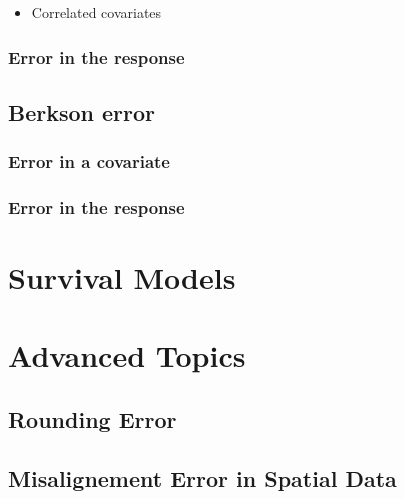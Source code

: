 \documentclass[]{book}
\providecommand{\tightlist}{%
  \setlength{\itemsep}{0pt}\setlength{\parskip}{0pt}}
\theoremstyle{definition}
\theoremstyle{definition}
\theoremstyle{definition}
\theoremstyle{remark}
\begin{document}
\begin{itemize}
\tightlist
\item
  Correlated covariates
\end{itemize}

\subsection{Error in the response}\label{error-in-the-response-1}

\section{Berkson error}\label{berkson-error}

\subsection{Error in a covariate}\label{error-in-a-covariate-1}

\subsection{Error in the response}\label{error-in-the-response-2}

\chapter{Survival Models}\label{Survival}

\chapter{Advanced Topics}\label{advancedTopics}

\section{Rounding Error}\label{rounding-error}

\section{Misalignement Error in Spatial
Data}\label{misalignement-error-in-spatial-data}


\end{document}
